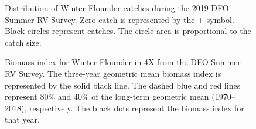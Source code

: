 \documentclass[11pt]{book}
\begin{document}
\begin{figure}[htb]

{\centering {} 

}

\caption{Distribution of Winter Flounder catches during the 2019 DFO Summer RV Survey. Zero catch is represented by the + symbol. Black circles represent catches. The circle area is proportional to the catch size.}\label{fig:60-map-winterflounder}
\end{figure}

\begin{figure}[htb]

{\centering {} 

}

\caption{Biomass index for Winter Flounder in 4X from the DFO Summer RV Survey. The three-year geometric mean biomass index is represented by the solid black line. The dashed blue and red lines represent 80\% and 40\% of the long-term geometric mean (1970--2018), respectively. The black dots represent the biomass index for that year.}\label{fig:61-fig-winterflounder-biomass4X}
\end{figure}
\end{document}
